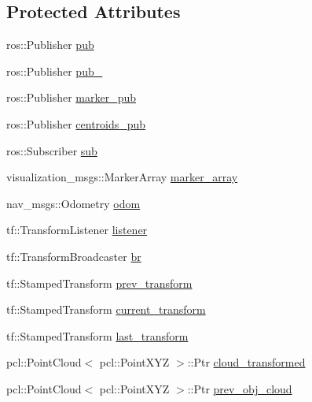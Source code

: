 \subsection*{Protected Attributes}
\begin{DoxyCompactItemize}
\item 
ros\+::\+Publisher \hyperlink{classdatmo_1_1cloud__segmentation_a01955e35ed0d12b9da4d4d9afb1007e3}{pub}
\item 
ros\+::\+Publisher \hyperlink{classdatmo_1_1cloud__segmentation_a0e1bf18752add68fc2df89e212750d91}{pub\+\_}
\item 
ros\+::\+Publisher \hyperlink{classdatmo_1_1cloud__segmentation_ad9e1760efffadbd3e46ed2f9eeb6b017}{marker\+\_\+pub}
\item 
ros\+::\+Publisher \hyperlink{classdatmo_1_1cloud__segmentation_a287579b3989262f060341ebca1ed53b2}{centroids\+\_\+pub}
\item 
ros\+::\+Subscriber \hyperlink{classdatmo_1_1cloud__segmentation_a72e340852b66e150cb7f0e25214b7439}{sub}
\item 
visualization\+\_\+msgs\+::\+Marker\+Array \hyperlink{classdatmo_1_1cloud__segmentation_ab5f26252358065a0341ffd790c68334e}{marker\+\_\+array}
\item 
nav\+\_\+msgs\+::\+Odometry \hyperlink{classdatmo_1_1cloud__segmentation_a2d267feed8b54b1eb2dffb9aed780082}{odom}
\item 
tf\+::\+Transform\+Listener \hyperlink{classdatmo_1_1cloud__segmentation_abf9b807df25f63ea330b165a9f2e4be1}{listener}
\item 
tf\+::\+Transform\+Broadcaster \hyperlink{classdatmo_1_1cloud__segmentation_aa2712034cbe68df4d19b0fcf87f9b465}{br}
\item 
tf\+::\+Stamped\+Transform \hyperlink{classdatmo_1_1cloud__segmentation_a89069ad666b67686b58c6072a9cd84e7}{prev\+\_\+transform}
\item 
tf\+::\+Stamped\+Transform \hyperlink{classdatmo_1_1cloud__segmentation_aeccad720664cddc17f8cfd9db29c1dad}{current\+\_\+transform}
\item 
tf\+::\+Stamped\+Transform \hyperlink{classdatmo_1_1cloud__segmentation_a2401065698d70527fff7a9d1bb491630}{last\+\_\+transform}
\item 
pcl\+::\+Point\+Cloud$<$ pcl\+::\+Point\+X\+YZ $>$\+::Ptr \hyperlink{classdatmo_1_1cloud__segmentation_a00e99233257fe5a28a039eef13dbc65b}{cloud\+\_\+transformed}
\item 
pcl\+::\+Point\+Cloud$<$ pcl\+::\+Point\+X\+YZ $>$\+::Ptr \hyperlink{classdatmo_1_1cloud__segmentation_aa1ea3bcb86aff4916200ff899a4198c4}{prev\+\_\+obj\+\_\+cloud}

\end{DoxyCompactItemize}
